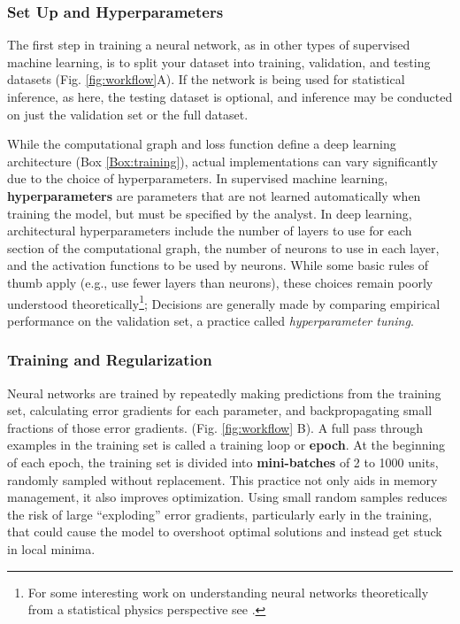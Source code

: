 \subsubsection{Set Up and Hyperparameters}

The first step in training a neural network, as in other types of supervised machine learning, is to split your dataset into training, validation, and testing datasets (Fig. \ref{fig:workflow}A). If the network is being used for statistical inference, as here, the testing dataset is optional, and inference may be conducted on just the validation set or the full dataset.

While the computational graph and loss function define a deep learning architecture (Box \ref{Box:training}), actual implementations can vary significantly due to the choice of hyperparameters. In supervised machine learning, \textbf{hyperparameters} are parameters that are not learned automatically when training the model, but must be specified by the analyst. In deep learning, architectural hyperparameters include the number of layers to use for each section of the computational graph, the number of neurons to use in each layer, and the activation functions to be used by neurons. While some basic rules of thumb apply (e.g., use fewer layers than neurons), these choices remain poorly understood theoretically\footnote{For some interesting work on understanding neural networks theoretically from a statistical physics perspective see \citet{PDLT-2022}.}; Decisions are generally made by comparing empirical performance on the validation set, a practice called \textit{hyperparameter tuning}.

\subsubsection{Training and Regularization}
\label{subsection:trainingregularization}

Neural networks are trained by repeatedly making predictions from the training set, calculating error gradients for each parameter, and backpropagating small fractions of those error gradients. (Fig. \ref{fig:workflow} B).  A full pass through examples in the training set is called a training loop or \textbf{epoch}. At the beginning of each epoch, the training set is divided into \textbf{mini-batches} of 2 to 1000 units, randomly sampled without replacement. This practice not only aids in memory management, it also improves optimization. Using small random samples reduces the risk of large “exploding” error gradients, particularly early in the training, that could cause the model to overshoot optimal solutions and instead get stuck in local minima.

